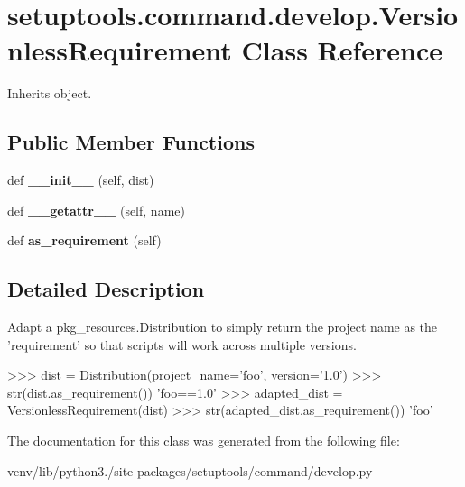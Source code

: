 \hypertarget{classsetuptools_1_1command_1_1develop_1_1_versionless_requirement}{}\section{setuptools.\+command.\+develop.\+Versionless\+Requirement Class Reference}
\label{classsetuptools_1_1command_1_1develop_1_1_versionless_requirement}


Inherits object.

\subsection*{Public Member Functions}
\begin{DoxyCompactItemize}
\item 
\mbox{\label{classsetuptools_1_1command_1_1develop_1_1_versionless_requirement_af061e705b06e1d98f3c129ea74805851}} 
def {\bfseries \+\_\+\+\_\+init\+\_\+\+\_\+} (self, dist)
\item 
\mbox{\label{classsetuptools_1_1command_1_1develop_1_1_versionless_requirement_a467f595f6bbaa8497ffd43176513b68b}} 
def {\bfseries \+\_\+\+\_\+getattr\+\_\+\+\_\+} (self, name)
\item 
\mbox{\label{classsetuptools_1_1command_1_1develop_1_1_versionless_requirement_ab9bc06f36f92fb67455cc2bf0e53ccb3}} 
def {\bfseries as\+\_\+requirement} (self)
\end{DoxyCompactItemize}


\subsection{Detailed Description}
\begin{DoxyVerb}Adapt a pkg_resources.Distribution to simply return the project
name as the 'requirement' so that scripts will work across
multiple versions.

>>> dist = Distribution(project_name='foo', version='1.0')
>>> str(dist.as_requirement())
'foo==1.0'
>>> adapted_dist = VersionlessRequirement(dist)
>>> str(adapted_dist.as_requirement())
'foo'
\end{DoxyVerb}
 

The documentation for this class was generated from the following file\+:\begin{DoxyCompactItemize}
\item 
venv/lib/python3./site-\/packages/setuptools/command/develop.\+py\end{DoxyCompactItemize}
